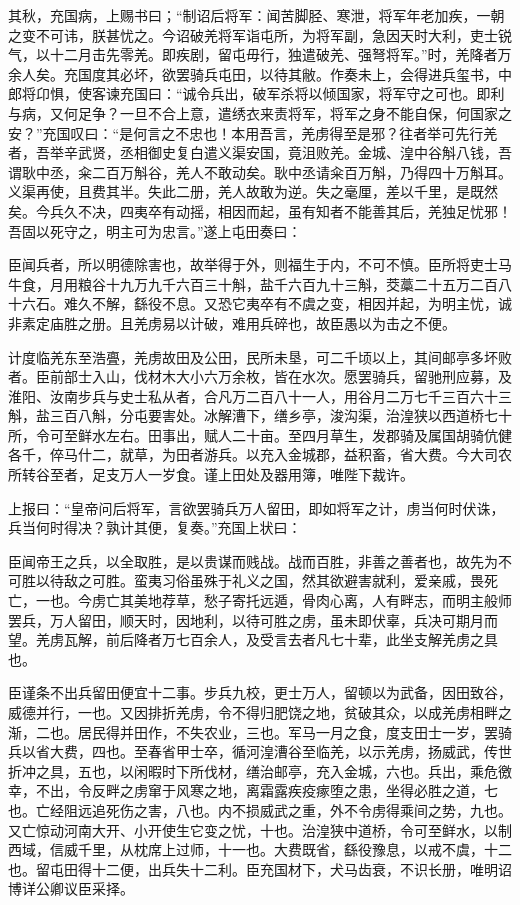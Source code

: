 \documentclass[]{article}
\begin{document}
其秋，充国病，上赐书曰；``制诏后将军：闻苦脚胫、寒泄，将军年老加疾，一朝之变不可讳，朕甚忧之。今诏破羌将军诣屯所，为将军副，急因天时大利，吏士锐气，以十二月击先零羌。即疾剧，留屯毋行，独遣破羌、强弩将军。''时，羌降者万余人矣。充国度其必坏，欲罢骑兵屯田，以待其敝。作奏未上，会得进兵玺书，中郎将卬惧，使客谏充国曰：``诚令兵出，破军杀将以倾国家，将军守之可也。即利与病，又何足争？一旦不合上意，遣绣衣来责将军，将军之身不能自保，何国家之安？''充国叹曰：``是何言之不忠也！本用吾言，羌虏得至是邪？往者举可先行羌者，吾举辛武贤，丞相御史复白遣义渠安国，竟沮败羌。金城、湟中谷斛八钱，吾谓耿中丞，籴二百万斛谷，羌人不敢动矣。耿中丞请籴百万斛，乃得四十万斛耳。义渠再使，且费其半。失此二册，羌人故敢为逆。失之毫厘，差以千里，是既然矣。今兵久不决，四夷卒有动摇，相因而起，虽有知者不能善其后，羌独足忧邪！吾固以死守之，明主可为忠言。''遂上屯田奏曰：

臣闻兵者，所以明德除害也，故举得于外，则福生于内，不可不慎。臣所将吏士马牛食，月用粮谷十九万九千六百三十斛，盐千六百九十三斛，茭藁二十五万二百八十六石。难久不解，繇役不息。又恐它夷卒有不虞之变，相因并起，为明主忧，诚非素定庙胜之册。且羌虏易以计破，难用兵碎也，故臣愚以为击之不便。

计度临羌东至浩亹，羌虏故田及公田，民所未垦，可二千顷以上，其间邮亭多坏败者。臣前部士入山，伐材木大小六万余枚，皆在水次。愿罢骑兵，留驰刑应募，及淮阳、汝南步兵与史士私从者，合凡万二百八十一人，用谷月二万七千三百六十三斛，盐三百八斛，分屯要害处。冰解漕下，缮乡亭，浚沟渠，治湟狭以西道桥七十所，令可至鲜水左右。田事出，赋人二十亩。至四月草生，发郡骑及属国胡骑伉健各千，倅马什二，就草，为田者游兵。以充入金城郡，益积畜，省大费。今大司农所转谷至者，足支万人一岁食。谨上田处及器用簿，唯陛下裁许。

上报曰：``皇帝问后将军，言欲罢骑兵万人留田，即如将军之计，虏当何时伏诛，兵当何时得决？孰计其便，复奏。''充国上状曰：

臣闻帝王之兵，以全取胜，是以贵谋而贱战。战而百胜，非善之善者也，故先为不可胜以待敌之可胜。蛮夷习俗虽殊于礼义之国，然其欲避害就利，爱亲戚，畏死亡，一也。今虏亡其美地荐草，愁子寄托远遁，骨肉心离，人有畔志，而明主般师罢兵，万人留田，顺天时，因地利，以待可胜之虏，虽未即伏辜，兵决可期月而望。羌虏瓦解，前后降者万七百余人，及受言去者凡七十辈，此坐支解羌虏之具也。

臣谨条不出兵留田便宜十二事。步兵九校，更士万人，留顿以为武备，因田致谷，威德并行，一也。又因排折羌虏，令不得归肥饶之地，贫破其众，以成羌虏相畔之渐，二也。居民得并田作，不失农业，三也。军马一月之食，度支田士一岁，罢骑兵以省大费，四也。至春省甲士卒，循河湟漕谷至临羌，以示羌虏，扬威武，传世折冲之具，五也，以闲暇时下所伐材，缮治邮亭，充入金城，六也。兵出，乘危徼幸，不出，令反畔之虏窜于风寒之地，离霜露疾疫瘃堕之患，坐得必胜之道，七也。亡经阻远追死伤之害，八也。内不损威武之重，外不令虏得乘间之势，九也。又亡惊动河南大开、小开使生它变之忧，十也。治湟狭中道桥，令可至鲜水，以制西域，信威千里，从枕席上过师，十一也。大费既省，繇役豫息，以戒不虞，十二也。留屯田得十二便，出兵失十二利。臣充国材下，犬马齿衰，不识长册，唯明诏博详公卿议臣采择。
\end{document}
